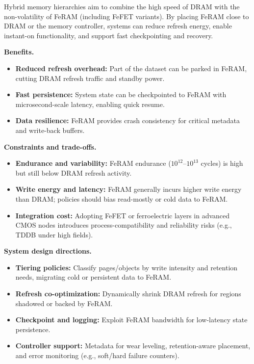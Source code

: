 
Hybrid memory hierarchies aim to combine the high speed of DRAM with the non-volatility of FeRAM (including FeFET variants). By placing FeRAM close to DRAM or the memory controller, systems can reduce refresh energy, enable instant-on functionality, and support fast checkpointing and recovery.

\noindent\textbf{Benefits.}
\begin{itemize}
  \item \textbf{Reduced refresh overhead:} Part of the dataset can be parked in FeRAM, cutting DRAM refresh traffic and standby power.
  \item \textbf{Fast persistence:} System state can be checkpointed to FeRAM with microsecond-scale latency, enabling quick resume.
  \item \textbf{Data resilience:} FeRAM provides crash consistency for critical metadata and write-back buffers.
\end{itemize}

\noindent\textbf{Constraints and trade-offs.}
\begin{itemize}
  \item \textbf{Endurance and variability:} FeRAM endurance ($10^{12}$--$10^{13}$ cycles) is high but still below DRAM refresh activity.
  \item \textbf{Write energy and latency:} FeRAM generally incurs higher write energy than DRAM; policies should bias read-mostly or cold data to FeRAM.
  \item \textbf{Integration cost:} Adopting FeFET or ferroelectric layers in advanced CMOS nodes introduces process-compatibility and reliability risks (e.g., TDDB under high fields).
\end{itemize}

\noindent\textbf{System design directions.}
\begin{itemize}
  \item \textbf{Tiering policies:} Classify pages/objects by write intensity and retention needs, migrating cold or persistent data to FeRAM.
  \item \textbf{Refresh co-optimization:} Dynamically shrink DRAM refresh for regions shadowed or backed by FeRAM.
  \item \textbf{Checkpoint and logging:} Exploit FeRAM bandwidth for low-latency state persistence.
  \item \textbf{Controller support:} Metadata for wear leveling, retention-aware placement, and error monitoring (e.g., soft/hard failure counters).
\end{itemize}

